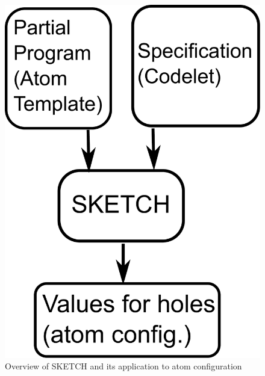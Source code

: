 \begin{figure}[!b]
  \begin{center}
  \includegraphics[width=0.4\columnwidth]{sketch.pdf}
  \caption{Overview of SKETCH and its application to atom configuration}
  \label{fig:sketch}
  \end{center}
\end{figure}

